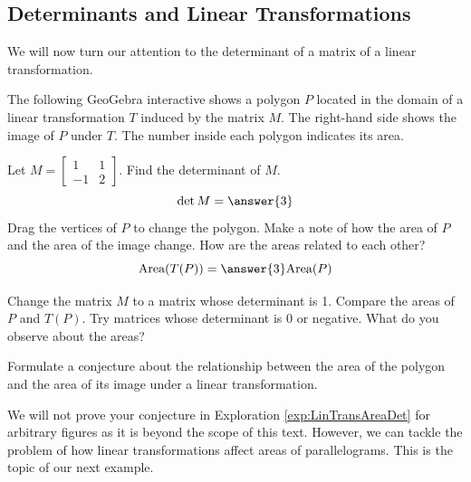 \documentclass{ximera}
\begin{document}
\subsection*{Determinants and Linear Transformations}
We will now turn our attention to the determinant of a matrix of a linear transformation.  

\begin{exploration}\label{exp:LinTransAreaDet}
The following GeoGebra interactive shows a polygon $P$ located in the domain of a linear transformation $T$ induced by the matrix $M$.  The right-hand side shows the image of $P$ under $T$.  The number inside each polygon indicates its area.


\begin{onlineOnly}
\begin{center}
\end{center}
\end{onlineOnly}

\begin{question}
Let $M=\begin{bmatrix}1&1\\-1&2\end{bmatrix}$.  Find the determinant of $M$.
$$\det{M}=\answer{3}$$
Drag the vertices of $P$ to change the polygon.  Make a note of how the area of $P$ and the area of the image change.  How are the areas related to each other?
$$\mbox{Area}(T(P))=\answer{3}\mbox{Area}(P)$$
\end{question}
\begin{question}
Change the matrix $M$ to a matrix whose determinant is 1.  Compare the areas of $P$ and $T(P)$.  Try matrices whose determinant is 0 or negative.  What do you observe about the areas?

Formulate a conjecture about the relationship between the area of the polygon and the area of its image under a linear transformation.
\end{question}
\end{exploration}
We will not prove your conjecture in Exploration \ref{exp:LinTransAreaDet} for arbitrary figures as it is beyond the scope of this text.  However, we can tackle the problem of how linear transformations affect areas of parallelograms.  This is the topic of our next example.
\end{document}

